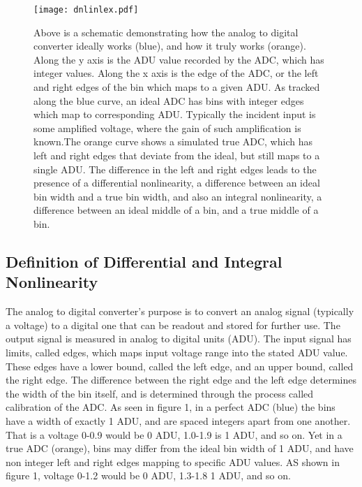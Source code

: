\documentclass[11pt, letterpaper]{article}
\begin{document}
\begin{figure}
	\texttt{[image: dnlinlex.pdf]}
	\caption{Above is a schematic demonstrating how the analog to digital converter ideally works (blue), and how it truly works (orange). Along the y axis is the ADU value recorded by the ADC, which has integer values. Along the x axis is the edge of the ADC, or the left and right edges of the bin which maps to a given ADU. As tracked along the blue curve, an ideal ADC has bins with integer edges which map to corresponding ADU. Typically the incident input is some amplified voltage, where the gain of such amplification is known.The orange curve shows a simulated true ADC, which has left and right edges that deviate from the ideal, but still maps to a single ADU. The difference in the left and right edges leads to the presence of a differential nonlinearity, a difference between an ideal bin width and a true bin width, and also an integral nonlinearity, a difference between an ideal middle of a bin, and a true middle of a bin.}
\end{figure}

\subsection{Definition of Differential and Integral Nonlinearity}
\indent 


The analog to digital converter’s purpose is to convert an analog signal (typically a voltage) to a digital one that can be readout and stored for further use. 
The output signal is measured in analog to digital units (ADU). 
The input signal has limits, called edges, which maps input voltage range into the stated ADU value. 
These edges have a lower bound, called the left edge, and an upper bound, called the right edge.
The difference between the right edge and the left edge determines the width of the bin itself, and is determined through the process called calibration of the ADC. 
As seen in figure 1, in a perfect ADC (blue) the bins have a width of exactly 1 ADU, and are spaced integers apart from one another. 
That is a voltage 0-0.9 would be 0 ADU, 1.0-1.9 is 1 ADU, and so on. 
Yet in a true ADC (orange), bins may differ from the ideal bin width of 1 ADU, and have non integer left and right edges mapping to specific ADU values. 
AS shown in figure 1, voltage 0-1.2 would be 0 ADU, 1.3-1.8 1 ADU, and so on. 
\indent 
\end{document}

